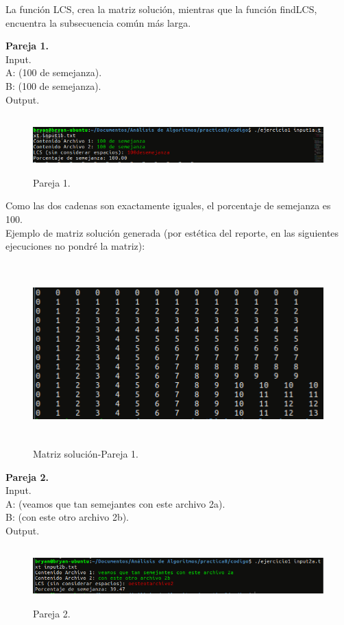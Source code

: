 \documentclass[12pt]{report}
\begin{document}
		
La función LCS, crea la matriz solución, mientras que la función findLCS, encuentra la subsecuencia común más larga.\newpage
	
	\textbf{Pareja 1.}\\
	Input.\\
	A: (100 de semejanza).\\
	B: (100 de semejanza).\\	
	Output.\\	
	\begin{figure}[H]
		\includegraphics[height=2.2cm,width=15cm]{imagenes/3.png}
		\centering
		\caption{Pareja 1.}
		\centering
	\end{figure}
	Como las dos cadenas son exactamente iguales, el porcentaje de semejanza es 100.\\	
	Ejemplo de matriz solución generada (por estética del reporte, en las siguientes ejecuciones no pondré la matriz):
	\begin{figure}[H]
		\includegraphics[height=7cm]{imagenes/3-1.png}
		\centering
		\caption{Matriz solución-Pareja 1.}
		\centering
	\end{figure}
	  \newpage
	
	\textbf{Pareja 2.}\\
	Input.\\
	A: (veamos que tan semejantes con este archivo 2a).\\
	B: (con este otro archivo 2b).\\	
	Output.\\	
	\begin{figure}[H]
		\includegraphics[height=2.2cm,width=15cm]{imagenes/4.png}
		\centering
		\caption{Pareja 2.}
		\centering
	\end{figure}
\end{document}

